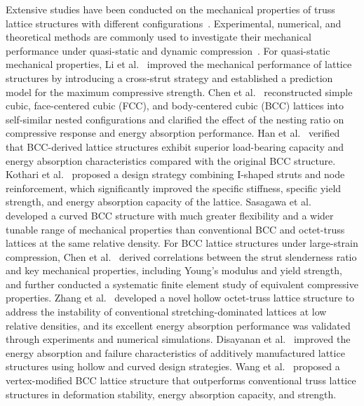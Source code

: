 \documentclass[12pt,a4paper]{article}
\begin{document}
	Extensive studies have been conducted on the mechanical properties of truss lattice structures with different configurations~\cite{Ref12,Ref13,Ref14,Ref15,Ref16,Ref17,Ref18,Ref19}. Experimental, numerical, and theoretical methods are commonly used to investigate their mechanical performance under quasi-static and dynamic compression~\cite{Ref20,Ref21,Ref22,Ref23,Ref24,Ref25,Ref26,Ref27,Ref28,Ref29}. For quasi-static mechanical properties, Li et al.~\cite{Ref30} improved the mechanical performance of lattice structures by introducing a cross-strut strategy and established a prediction model for the maximum compressive strength. Chen et al.~\cite{Ref31} reconstructed simple cubic, face-centered cubic (FCC), and body-centered cubic (BCC) lattices into self-similar nested configurations and clarified the effect of the nesting ratio on compressive response and energy absorption performance. Han et al.~\cite{Ref32} verified that BCC-derived lattice structures exhibit superior load-bearing capacity and energy absorption characteristics compared with the original BCC structure. Kothari et al.~\cite{Ref33} proposed a design strategy combining I-shaped struts and node reinforcement, which significantly improved the specific stiffness, specific yield strength, and energy absorption capacity of the lattice. Sasagawa et al.~\cite{Ref34} developed a curved BCC structure with much greater flexibility and a wider tunable range of mechanical properties than conventional BCC and octet-truss lattices at the same relative density. For BCC lattice structures under large-strain compression, Chen et al.~\cite{Ref35} derived correlations between the strut slenderness ratio and key mechanical properties, including Young's modulus and yield strength, and further conducted a systematic finite element study of equivalent compressive properties. Zhang et al.~\cite{Ref36} developed a novel hollow octet-truss lattice structure to address the instability of conventional stretching-dominated lattices at low relative densities, and its excellent energy absorption performance was validated through experiments and numerical simulations. Disayanan et al.~\cite{Ref37} improved the energy absorption and failure characteristics of additively manufactured lattice structures using hollow and curved design strategies. Wang et al.~\cite{Ref38} proposed a vertex-modified BCC lattice structure that outperforms conventional truss lattice structures in deformation stability, energy absorption capacity, and strength.
	
\end{document}
